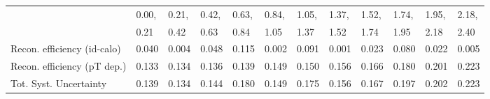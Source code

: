 \begin{tabular}{l|p{0.6cm}p{0.6cm}p{0.6cm}p{0.6cm}p{0.6cm}p{0.6cm}p{0.6cm}p{0.6cm}p{0.6cm}p{0.6cm}p{0.6cm}}
\hline
   & 0.00, & 0.21, & 0.42, & 0.63, & 0.84, & 1.05, & 1.37, & 1.52, & 1.74, & 1.95, & 2.18,  \\ 
   & 0.21 & 0.42 & 0.63 & 0.84 & 1.05 & 1.37 & 1.52 & 1.74 & 1.95 & 2.18 & 2.40  \\ 
\hline
Recon. efficiency (id-calo)              & 0.040 & 0.004 & 0.048 & 0.115 & 0.002 & 0.091 & 0.001 & 0.023 & 0.080 & 0.022 & 0.005 \\
\hline
Recon. efficiency (pT dep.)              & 0.133 & 0.134 & 0.136 & 0.139 & 0.149 & 0.150 & 0.156 & 0.166 & 0.180 & 0.201 & 0.223 \\
\hline
Tot. Syst. Uncertainty                   & 0.139 & 0.134 & 0.144 & 0.180 & 0.149 & 0.175 & 0.156 & 0.167 & 0.197 & 0.202 & 0.223 \\
\hline
\end{tabular}

